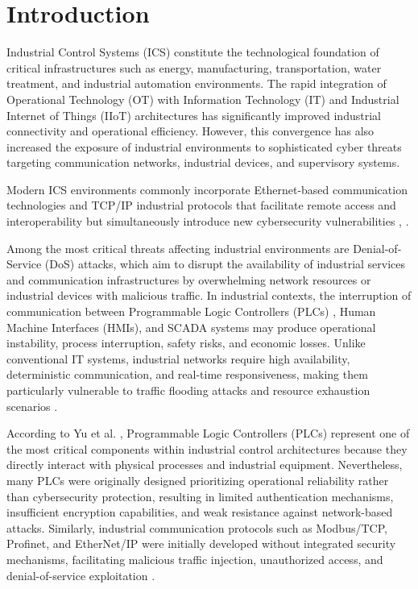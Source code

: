 \documentclass[sigconf]{acmart}
\begin{document}

\maketitle

\section{Introduction}
Industrial Control Systems (ICS) constitute the technological foundation of critical infrastructures such as energy, manufacturing, transportation, water treatment, and industrial automation environments. The rapid integration of Operational Technology (OT) with Information Technology (IT) and Industrial Internet of Things (IIoT) architectures has significantly improved industrial connectivity and operational efficiency. However, this convergence has also increased the exposure of industrial environments to sophisticated cyber threats targeting communication networks, industrial devices, and supervisory systems.

Modern ICS environments commonly incorporate Ethernet-based communication technologies and TCP/IP industrial protocols that facilitate remote access and interoperability but simultaneously introduce new cybersecurity vulnerabilities \cite{Gillen2020ICS}, \cite{Tama2022IDS}.

Among the most critical threats affecting industrial environments are Denial-of-Service (DoS) attacks, which aim to disrupt the availability of industrial services and communication infrastructures by overwhelming network resources or industrial devices with malicious traffic. In industrial contexts, the interruption of communication between Programmable Logic Controllers (PLCs) \cite{Raman2021ICS}, Human Machine Interfaces (HMIs), and SCADA systems may produce operational instability, process interruption, safety risks, and economic losses. Unlike conventional IT systems, industrial networks require high availability, deterministic communication, and real-time responsiveness, making them particularly vulnerable to traffic flooding attacks and resource exhaustion scenarios \cite{Benka2025ICS}.

According to Yu et al. \cite{Yu2019Ethernet}, Programmable Logic Controllers (PLCs) represent one of the most critical components within industrial control architectures because they directly interact with physical processes and industrial equipment. Nevertheless, many PLCs were originally designed prioritizing operational reliability rather than cybersecurity protection, resulting in limited authentication mechanisms, insufficient encryption capabilities, and weak resistance against network-based attacks. Similarly, industrial communication protocols such as Modbus/TCP, Profinet, and EtherNet/IP were initially developed without integrated security mechanisms, facilitating malicious traffic injection, unauthorized access, and denial-of-service exploitation \cite{Modbus2025IDS}.
\end{document}

